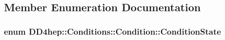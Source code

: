 \subsection{Member Enumeration Documentation}
\hypertarget{class_d_d4hep_1_1_conditions_1_1_condition_a22825c02029e39fd0aa95c08c9be56d9}{
\subsubsection[{ConditionState}]{\setlength{\rightskip}{0pt plus 5cm}enum {\bf DD4hep::Conditions::Condition::ConditionState}}}
\label{class_d_d4hep_1_1_conditions_1_1_condition_a22825c02029e39fd0aa95c08c9be56d9}
